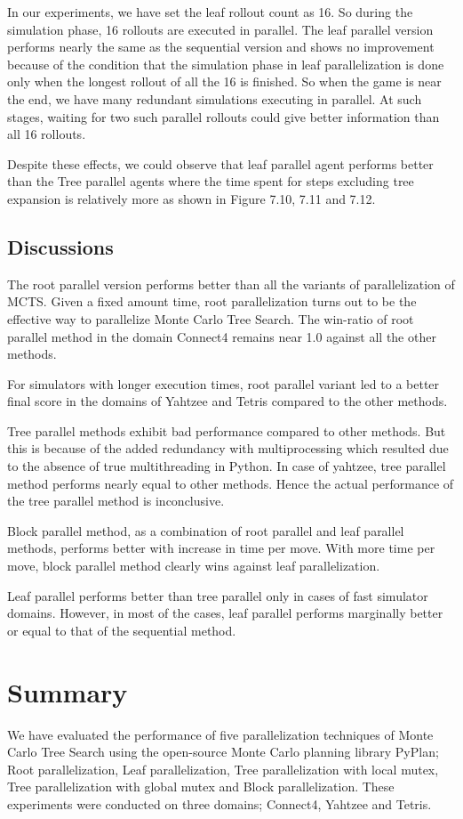 \documentclass[double,12pt]{beavtex}
\begin{document}
In our experiments, we have set the leaf rollout count as 16. So during the simulation phase, 16 rollouts are executed in parallel. The leaf parallel version performs nearly the same as the sequential version and shows no improvement because of the condition that the simulation phase in leaf parallelization is done only when the longest rollout of all the 16 is finished. So when the game is near the end, we have many redundant simulations executing in parallel. At such stages, waiting for two such parallel rollouts could give better information than all 16 rollouts. 

Despite these effects, we could observe that leaf parallel agent performs better than the Tree parallel agents where the time spent for steps excluding tree expansion is relatively more as shown in Figure 7.10, 7.11 and 7.12. 

\section{Discussions}
The root parallel version performs better than all the variants of parallelization of MCTS. Given a fixed amount time, root parallelization turns out to be the effective way to parallelize Monte Carlo Tree Search. The win-ratio of root parallel method in the domain Connect4 remains near 1.0 against all the other methods. 

For simulators with longer execution times, root parallel variant led to a better final score in the domains of Yahtzee and Tetris compared to the other methods. 

Tree parallel methods exhibit bad performance compared to other methods. But this is because of the added redundancy with multiprocessing which resulted due to the absence of true multithreading in Python. In case of yahtzee, tree parallel method performs nearly equal to other methods. Hence the actual performance of the tree parallel method is inconclusive. 

Block parallel method, as a combination of root parallel and leaf parallel methods, performs better with increase in time per move. With more time per move, block parallel method clearly wins against leaf parallelization.

Leaf parallel performs better than tree parallel only in cases of fast simulator domains. However, in most of the cases, leaf parallel performs marginally better or equal to that of the sequential method.

\chapter{Summary}
We have evaluated the performance of five parallelization techniques of Monte Carlo Tree Search using the open-source Monte Carlo planning library PyPlan; Root parallelization, Leaf parallelization, Tree parallelization with local mutex, Tree parallelization with global mutex and Block parallelization. These experiments were conducted on three domains; Connect4, Yahtzee and Tetris. 
\end{document}
